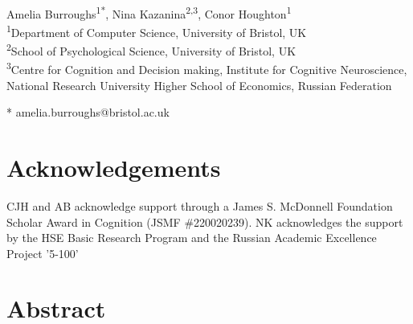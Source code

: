 \documentclass[10pt,letterpaper]{article}
\date{}
\begin{document}
\vspace*{0.2in}

\begin{flushleft}
{\Large
\textbf{} 
}
\newline
\\
Amelia Burroughs\textsuperscript{1*},
Nina Kazanina\textsuperscript{2,3},
Conor Houghton\textsuperscript{1}
\\
\bigskip
\textsuperscript{1}Department of Computer Science, University of Bristol, UK\\
\textsuperscript{2}School of Psychological Science, University of Bristol, UK\\
\textsuperscript{3}Centre for Cognition and Decision making, Institute for Cognitive Neuroscience, National Research University Higher School of Economics, Russian Federation
\\
\bigskip

* amelia.burroughs@bristol.ac.uk

\end{flushleft}


\section*{Acknowledgements}
CJH and AB acknowledge support through a James S. McDonnell Foundation
Scholar Award in Cognition (JSMF \#220020239). NK acknowledges the
support by the HSE Basic Research Program and the Russian Academic
Excellence Project '5-100'


\section*{Abstract}
\end{document}
